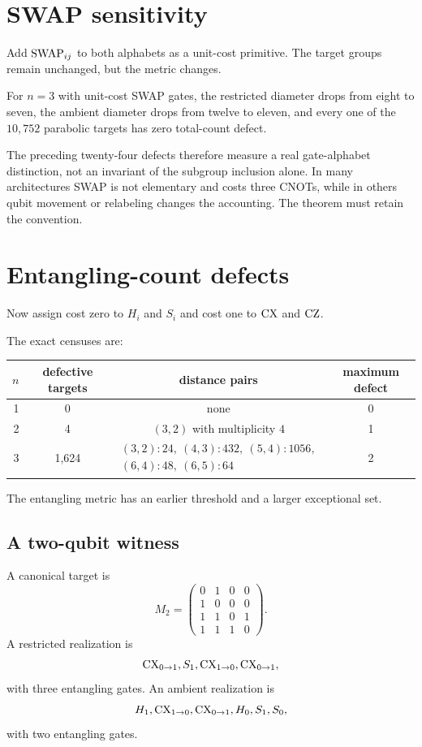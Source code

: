 \section{SWAP sensitivity}
Add $\operatorname{SWAP}_{ij}$ to both alphabets as a unit-cost primitive.  The target groups remain unchanged, but the metric changes.

\begin{computedbox}
For $n=3$ with unit-cost SWAP gates, the restricted diameter drops from eight to seven, the ambient diameter drops from twelve to eleven, and every one of the $10,752$ parabolic targets has zero total-count defect.
\end{computedbox}

The preceding twenty-four defects therefore measure a real gate-alphabet distinction, not an invariant of the subgroup inclusion alone.  In many architectures SWAP is not elementary and costs three CNOTs, while in others qubit movement or relabeling changes the accounting.  The theorem must retain the convention.

\section{Entangling-count defects}
Now assign cost zero to $H_i$ and $S_i$ and cost one to $\operatorname{CX}$ and $\operatorname{CZ}$.

\begin{computedbox}
The exact censuses are:
\begin{center}
\begin{tabular}{@{}rccc@{}}
\toprule
$n$&defective targets&distance pairs&maximum defect\\
\midrule
1&0&none&0\\
2&4&$(3,2)$ with multiplicity $4$&1\\
3&1,624&
$\begin{array}{c}
(3,2):24,\ (4,3):432,\ (5,4):1056,\\
(6,4):48,\ (6,5):64
\end{array}$
&2\\
\bottomrule
\end{tabular}
\end{center}
\end{computedbox}
The entangling metric has an earlier threshold and a larger exceptional set.

\subsection{A two-qubit witness}
A canonical target is
\[
M_2=
\begin{pmatrix}
0&1&0&0\\
1&0&0&0\\
1&1&0&1\\
1&1&1&0
\end{pmatrix}.
\]
A restricted realization is
\[
\operatorname{CX}_{0\to1},
S_1,
\operatorname{CX}_{1\to0},
\operatorname{CX}_{0\to1},
\]
with three entangling gates.  An ambient realization is
\[
H_1,
\operatorname{CX}_{1\to0},
\operatorname{CX}_{0\to1},
H_0,
S_1,
S_0,
\]
with two entangling gates.

